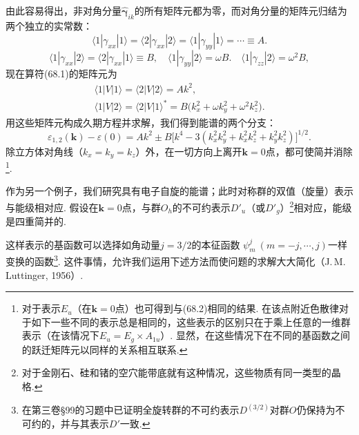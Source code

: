 由此容易得出，非对角分量$\hat{\bm{\gamma}}_{ik}$的所有矩阵元都为零，而对角分量的矩阵元归结为两个独立的实常数：
\begin{equation*}
\langle1|\gamma_{xx}|1\rangle=\langle2|\gamma_{xx}|2\rangle
=\langle1|\gamma_{yy}|1\rangle=\cdots\equiv A.
\end{equation*}
\begin{equation*}
\langle1|\gamma_{xx}|2\rangle=\langle2|\gamma_{xx}|1\rangle\equiv B,\quad
\langle1|\gamma_{yy}|2\rangle=\omega B.\quad
\langle1|\gamma_{zz}|2\rangle=\omega^2B,
\end{equation*}
现在算符(68.1)的矩阵元为
\begin{equation*}
\begin{gathered}
\langle1|V|1\rangle=\langle2|V|2\rangle=Ak^2,\\
\langle1|V|2\rangle=\langle2|V|1\rangle^{*}
=B\bigl(k_x^2+\omega k_y^2+\omega^2k_z^2\bigr).
\end{gathered}
\end{equation*}
用这些矩阵元构成久期方程并求解，我们得到能谱的两个分支：
\begin{equation}
\varepsilon_{1,2}(\bm{k})-\varepsilon(0)=Ak^2\pm
B\bigl[k^4-3(k_x^2k_y^2+k_x^2k_z^2+k_y^2k_z^2)\bigr]^{1/2}.
\end{equation}
除立方体对角线（$k_x=k_y=k_z$）外，在一切方向上离开$\bm{k}=0$点，都可使简并消除\footnote{对于表示$E_u$（在$\bm k=0$点）也可得到与(68.2)相同的结果. 在该点附近色散律对于如下一些不同的表示总是相同的，这些表示的区别只在于乘上任意的一维群表示（在该情况下$E_u=E_g\times A_{1u}$）. 显然，在这些情况下在不同的基函数之间的跃迁矩阵元以同样的关系相互联系.}.

作为另一个例子，我们研究具有电子自旋的能谱；此时对称群的双值（旋量）表示与能级相对应. 假设在$\bm{k}=0$点，与群$O_h$的不可约表示$D'_u$（或$D'_g$）\footnote{对于金刚石、硅和锗的空穴能带底就有这种情况，这些物质有同一类型的晶格.}相对应，能级是四重简并的.

这样表示的基函数可以选择如角动量$j=3/2$的本征函数
$\psi^j_m\ (m=-j,\cdots,j)$一样变换的函数\footnote{在第三卷§99的习题中已证明全旋转群的不可约表示$D^{(3/2)}$对群$O$仍保持为不可约的，并与其表示$D'$一致.}. 这件事情，允许我们运用下述方法而使问题的求解大大简化（J.\,M.\,Luttinger, 1956）.

